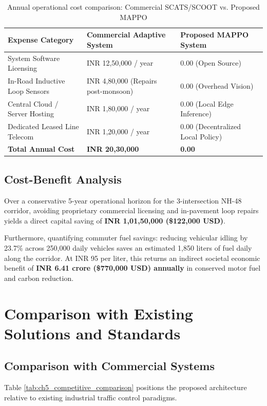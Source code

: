 \begin{table}[htbp]
\centering
\small
\caption{Annual operational cost comparison: Commercial SCATS/SCOOT vs. Proposed MAPPO}
\label{tab:ch5_cost_comp}
\begin{tabularx}{\textwidth}{|p{5.5cm}|p{4.5cm}|X|}
\hline
\textbf{Expense Category} & \textbf{Commercial Adaptive System} & \textbf{Proposed MAPPO System} \\ \hline
System Software Licensing & INR 12,50,000 / year & 0.00 (Open Source) \\ \hline
In-Road Inductive Loop Sensors & INR 4,80,000 (Repairs post-monsoon) & 0.00 (Overhead Vision) \\ \hline
Central Cloud / Server Hosting & INR 1,80,000 / year & 0.00 (Local Edge Inference) \\ \hline
Dedicated Leased Line Telecom & INR 1,20,000 / year & 0.00 (Decentralized Local Policy) \\ \hline
\textbf{Total Annual Cost} & \textbf{INR 20,30,000} & \textbf{0.00} \\ \hline
\end{tabularx}
\end{table}

\subsection{Cost-Benefit Analysis}
Over a conservative 5-year operational horizon for the 3-intersection NH-48 corridor, avoiding proprietary commercial licensing and in-pavement loop repairs yields a direct capital saving of \textbf{INR 1,01,50,000 (\$122,000 USD)}.

Furthermore, quantifying commuter fuel savings: reducing vehicular idling by 23.7\% across 250,000 daily vehicles saves an estimated 1,850 liters of fuel daily along the corridor. At INR 95 per liter, this returns an indirect societal economic benefit of \textbf{INR 6.41 crore (\$770,000 USD) annually} in conserved motor fuel and carbon reduction.

\section{Comparison with Existing Solutions and Standards}
\label{sec:ch5_comparative_position}

\subsection{Comparison with Commercial Systems}
Table \ref{tab:ch5_competitive_comparison} positions the proposed architecture relative to existing industrial traffic control paradigms.

